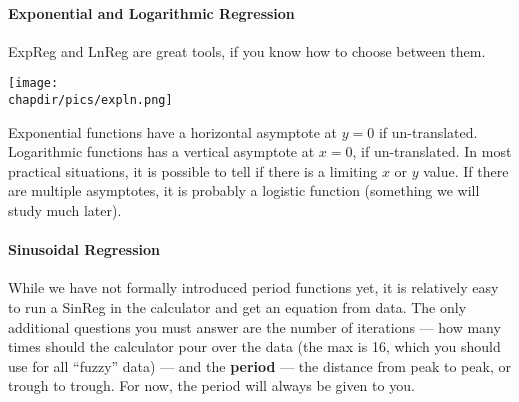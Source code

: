 \paragraph{Exponential and Logarithmic Regression}
ExpReg and LnReg are great tools, if you know how to choose between them.

\texttt{[image: \\chapdir/pics/expln.png]}

Exponential functions have a horizontal asymptote at $y=0$ if un-translated.  Logarithmic functions
has a vertical asymptote at $x=0$, if un-translated.  In most practical situations, 
it is possible to tell if
there is a limiting $x$ or $y$ value.  If there are multiple asymptotes, it is probably a logistic function
(something we will study much later).

\paragraph{Sinusoidal Regression}
While we have not formally introduced period functions yet, it is relatively easy to run a SinReg in the calculator
and get an equation from data.  The only additional questions you must answer are the number of iterations ---
how many times should the calculator pour over the data (the max is 16, which you should use for all ``fuzzy''
data) --- and the \textbf{period} --- the distance from peak to peak, or trough to trough.  For now, the period will
always be given to you.
